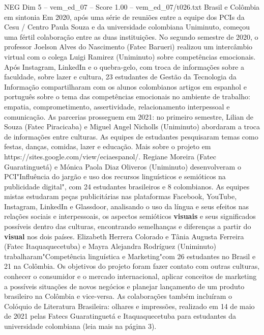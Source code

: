 \begin{textsample}{NEG Dim 5 – vem\_ed\_07 – Score 1.00 – vem\_ed\_07/t026.txt}  \label{ex:f5_neg_017}
Brasil e Colômbia em sintonia Em 2020, após uma série de reuniões entre a equipe dos PCIs da Cesu / Centro Paula Souza e da universidade colombiana Uniminuto, começou uma fértil colaboração entre as duas instituições.
No segundo semestre de 2020, o professor Joelson Alves do Nascimento (Fatec Barueri) realizou um intercâmbio virtual com o colega Luigi Ramirez (Uniminuto) sobre competências emocionais.
Após Instagram, LinkedIn e o quebra-gelo, com troca de informações sobre a faculdade, sobre lazer e cultura, 23 estudantes de Gestão da Tecnologia da Informação compartilharam com os alunos colombianos artigos em espanhol e português sobre o tema das competências emocionais no ambiente de trabalho: empatia, comprometimento, assertividade, relacionamento interpessoal e comunicação.
As parcerias prosseguem em 2021: no primeiro semestre, Lilian de Souza (Fatec Piracicaba) e Miguel Angel Nicholls (Uniminuto) abordaram a troca de informações entre culturas.
As equipes de estudantes pesquisaram temas como festas, danças, comidas, lazer e educação.
Mais sobre o projeto em https://sites.google.com/view/eciaespanol/.
Regiane Moreira (Fatec Guaratinguetá) e Mónica Paola Diaz Oliveros (Uniminuto) desenvolveram o PCI"Influência do jargão e uso dos recursos linguísticos e semióticos na publicidade digital", com 24 estudantes brasileiros e 8 colombianos.
As equipes mistas estudaram peças publicitárias nas plataformas Facebook, YouTube, Instagram, LinkedIn e Glassdoor, analisando o uso da língua e seus efeitos nas relações sociais e interpessoais, os aspectos semióticos \textbf{visuais} e seus significados possíveis dentro das culturas, encontrando semelhanças e diferenças a partir do \textbf{visual} nos dois países.
Elizabeth Herrera Colorado e Tânia Augusta Ferreira (Fatec Itaquaquecetuba) e Mayra Alejandra Rodríguez (Uniminuto) trabalharam"Competência linguística e Marketing"com 26 estudantes no Brasil e 21 na Colômbia.
Os objetivos do projeto foram fazer contato com outras culturas, conhecer o consumidor e o mercado internacional, aplicar conceitos de marketing a possíveis situações de novos negócios e planejar lançamento de um produto brasileiro na Colômbia e vice-versa.
As colaborações também incluíram o Colóquio de Literatura Brasileira: olhares e impressões, realizado em 14 de maio de 2021 pelas Fatecs Guaratinguetá e Itaquaquecetuba para estudantes da universidade colombiana (leia mais na página 3).

\end{textsample}
